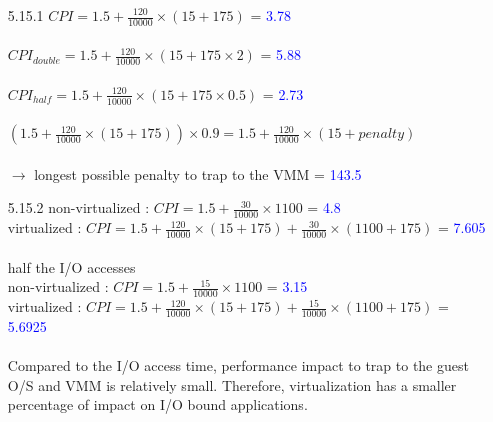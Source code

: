 \documentclass[12pt, a4paper]{article}
\begin{document}
\begin{itemize}[font=\bfseries]
\item[5.15.1]
$CPI = 1.5 + \displaystyle \frac{120}{10000} \times (15 + 175)$ = \textcolor{blue}{3.78} \\
\vspace*{0.1cm} \\
$CPI_{double} = 1.5 + \displaystyle \frac{120}{10000} \times (15 + 175 \times 2)$ = \textcolor{blue}{5.88} \\
\vspace*{0.1cm} \\
$CPI_{half} = 1.5 + \displaystyle \frac{120}{10000} \times (15 + 175 \times 0.5)$ = \textcolor{blue}{2.73} \\
\vspace*{0.1cm} \\
$(1.5 + \displaystyle \frac{120}{10000} \times (15 + 175)) \times 0.9 = 1.5 + \displaystyle \frac{120}{10000} \times (15 + penalty)$ \\ 
\vspace*{0cm} \\
$\longrightarrow$ longest possible penalty to trap to the VMM = \textcolor{blue}{143.5} 

\item[5.15.2]
non-virtualized : $CPI = 1.5 + \displaystyle \frac{30}{10000} \times 1100$ = \textcolor{blue}{4.8} \\
virtualized : $CPI = 1.5 + \displaystyle \frac{120}{10000} \times (15 + 175) + \displaystyle \frac{30}{10000} \times (1100 + 175)$ = \textcolor{blue}{7.605} \\
\vspace*{0.2cm} \\
half the I/O accesses \\
non-virtualized : $CPI = 1.5 + \displaystyle \frac{15}{10000} \times 1100$ = \textcolor{blue}{3.15} \\
virtualized : $CPI = 1.5 + \displaystyle \frac{120}{10000} \times (15 + 175) + \displaystyle \frac{15}{10000} \times (1100 + 175)$ = \textcolor{blue}{5.6925} \\
\vspace*{0.2cm} \\
\newpage
Compared to the I/O access time, performance impact to trap to the guest O/S and VMM is relatively small. Therefore, virtualization has a smaller percentage of impact on I/O bound applications.

\end{itemize}
\end{document}

